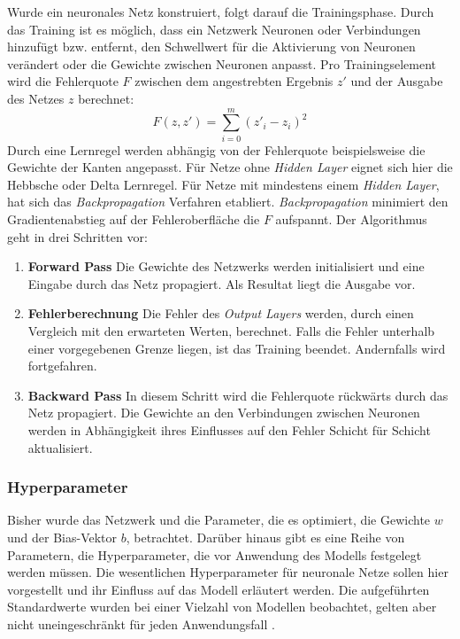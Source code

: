 Wurde ein neuronales Netz konstruiert, folgt darauf die Trainingsphase. Durch das Training ist es möglich, dass ein Netzwerk Neuronen oder Verbindungen hinzufügt bzw. entfernt, den Schwellwert für die Aktivierung von Neuronen verändert oder die Gewichte zwischen Neuronen anpasst. Pro Trainingselement wird die Fehlerquote $F$ zwischen dem angestrebten Ergebnis $z'$ und der Ausgabe des Netzes $z$ berechnet:
$$ F(z, z')=\sum_{i=0}^{m}(z'_{i} - z_{i})^2 $$
Durch eine Lernregel werden abhängig von der Fehlerquote beispielsweise die Gewichte der Kanten angepasst. Für Netze ohne \textit{Hidden Layer} eignet sich hier die Hebbsche oder Delta Lernregel. Für Netze mit mindestens einem \textit{Hidden Layer}, hat sich das \textit{Backpropagation} Verfahren etabliert. \textit{Backpropagation} minimiert den Gradientenabstieg auf der Fehleroberfläche die $F$ aufspannt. Der Algorithmus geht in drei Schritten vor:

\begin{enumerate}
	\item \textbf{Forward Pass} Die Gewichte des Netzwerks werden initialisiert und eine Eingabe durch das Netz propagiert. Als Resultat liegt die Ausgabe vor.
	\item \textbf{Fehlerberechnung} Die Fehler des \textit{Output Layers} werden, durch einen Vergleich mit den erwarteten Werten, berechnet. Falls die Fehler unterhalb einer vorgegebenen Grenze liegen, ist das Training beendet. Andernfalls wird fortgefahren.
	\item \textbf{Backward Pass} In diesem Schritt wird die Fehlerquote rückwärts durch das Netz propagiert. Die Gewichte an den Verbindungen zwischen Neuronen werden in Abhängigkeit ihres Einflusses auf den Fehler Schicht für Schicht aktualisiert.
\end{enumerate}

\subsubsection{Hyperparameter}

Bisher wurde das Netzwerk und die Parameter, die es optimiert, die Gewichte $w$ und der Bias-Vektor $b$, betrachtet. Darüber hinaus gibt es eine Reihe von Parametern, die Hyperparameter, die vor Anwendung des Modells festgelegt werden müssen. Die wesentlichen Hyperparameter für neuronale Netze sollen hier vorgestellt und ihr Einfluss auf das Modell erläutert werden. Die aufgeführten Standardwerte wurden bei einer Vielzahl von Modellen beobachtet, gelten aber nicht uneingeschränkt für jeden Anwendungsfall \cite{pda2012}. 

